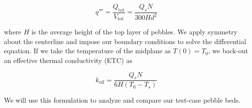 \begin{equation}
	q''' = \frac{Q_\text{tot}}{V_\text{tot}} = \frac{Q_sN}{300Hd^2}
\end{equation}

where $H$ is the average height of the top layer of pebbles. We apply symmetry about the centerline and impose our boundary conditions to solve the differential equation. If we take the temperature of the midplane as $T(0) = T_0$, we back-out an effective thermal conductivity (ETC) as

\begin{equation}\label{eq:etc}
	k_\text{eff} = \frac{Q_sN}{6H(T_0-T_s)}
\end{equation}


We will use this formulation to analyze and compare our test-case pebble beds.



